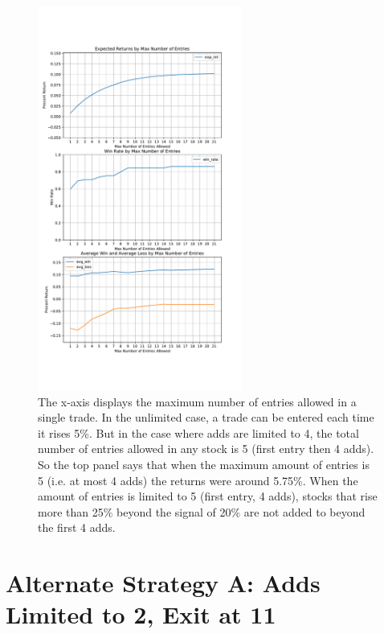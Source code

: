 \documentclass{article}
\begin{document}
	\begin{figure}
	
	\includegraphics[width=0.6\textwidth]{prog_entry_3plot.pdf}
	\caption{The x-axis displays the maximum number of entries allowed in a single trade. In the unlimited case, a trade can be entered each time it rises 5\%. But in the case where adds are limited to 4, the total number of entries allowed in any stock is 5 (first entry then 4 adds). So the top panel says that when the maximum amount of entries is 5 (i.e. at most 4 adds) the returns were around 5.75\%. When the amount of entries is limited to 5 (first entry, 4 adds), stocks that rise more than 25\% beyond the signal of 20\% are not added to beyond the first 4 adds.}
	\label{3plot_strat}
	\end{figure}
	
	
\pagebreak

\section{Alternate Strategy A: Adds Limited to 2, Exit at 11}
\end{document}
